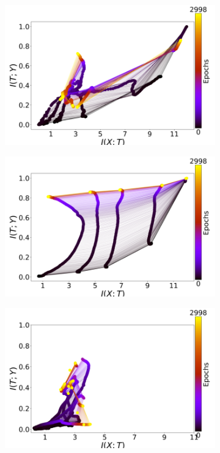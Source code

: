 \documentclass[conference, 5pt]{IEEEtran}
\begin{document}
\begin{figure}
\begin{subfigure}{0.32\linewidth}
\end{subfigure}
        	\begin{subfigure}{0.32\linewidth}
    \label{fig:sp_activation}
	\includegraphics[width=\columnwidth]{activations/softplus.png}
\end{subfigure}
        	\begin{subfigure}{0.32\linewidth}
    \label{fig:ss_activation}
	\includegraphics[width=\columnwidth]{activations/softsign.png}
\end{subfigure}
        	\begin{subfigure}{0.32\linewidth}
    \label{fig:lsm_activation}
	\includegraphics[width=\columnwidth]{activations/log_softmax.png}

\end{subfigure}
\end{figure}
\end{document}
